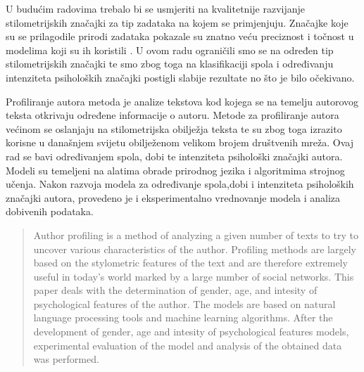 \documentclass[times, utf8, zavrsni]{fer}
\begin{document}
U budućim radovima trebalo bi se usmjeriti na kvalitetnije razvijanje stilometrijskih značajki za tip zadataka na kojem se primjenjuju. Značajke koje su se prilagodile prirodi zadataka pokazale su znatno veću preciznost i točnost u modelima koji su ih koristili \citep{rangle2015}. U ovom radu ograničili smo se na određen tip stilometrijskih značajki te smo zbog toga na klasifikaciji spola i određivanju intenziteta psiholoških značajki postigli slabije rezultate no što je bilo očekivano.




\begin{sazetak}

Profiliranje autora metoda je analize tekstova kod kojega se na temelju autorovog teksta otkrivaju određene informacije o autoru. Metode za profiliranje autora većinom se oslanjaju na stilometrijska obilježja teksta te su zbog toga izrazito korisne u današnjem svijetu obilježenom velikom brojem društvenih mreža. Ovaj rad se bavi određivanjem spola, dobi te intenziteta psihološki značajki autora. Modeli su temeljeni na alatima obrade prirodnog jezika i algoritmima strojnog učenja. Nakon razvoja modela za određivanje spola,dobi i intenziteta psiholoških značajki autora, provedeno je i eksperimentalno vrednovanje modela i analiza dobivenih podataka.


\end{sazetak}

\begin{abstract}
	Author profiling is a method of analyzing a given number of texts to try to uncover various characteristics of the author.
	Profiling methods are largely based on the stylometric features of the text and are therefore extremely useful in today's world marked by a large number of social networks. This paper deals with the determination of gender, age, and intesity of psychological features of the author. The models are based on natural language processing tools and machine learning algorithms. After the development of gender, age and intesity of psychological features models, experimental evaluation of the model and analysis of the obtained data was performed.

\end{abstract}
\end{document}
